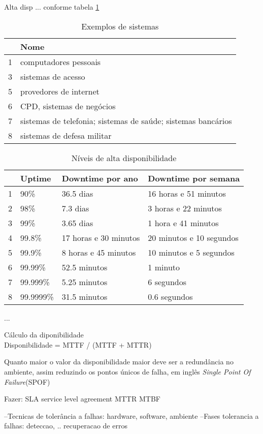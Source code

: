 Alta disp ... conforme tabela \ref{tab:dispexemplos}
\begin{table}
\caption {Exemplos de sistemas}
\label{tab:dispexemplos} 
\begin{center}
\begin{tabular}{|l|l|}\hline
  & Nome\\\hline
1 & computadores pessoais\\\hline
3 & sistemas de acesso\\\hline
5 & provedores de internet\\\hline
6 & CPD, sistemas de negócios\\\hline
7 & sistemas de telefonia; sistemas de saúde; sistemas bancários\\\hline
8 & sistemas de defesa militar\\\hline
\end{tabular}
\end{center}
\end{table}

\begin{table}
\caption {Níveis de alta disponibilidade}
\label{tab:dispniveis} 
\begin{center}
\begin{tabular}{|l|l|l|l|}\hline
  & Uptime & Downtime por ano & Downtime por semana\\\hline
1 & 90\% & 36.5 dias & 16 horas e 51 minutos\\\hline
2 & 98\% & 7.3 dias & 3 horas e 22 minutos\\\hline
3 & 99\% & 3.65 dias & 1 hora e 41 minutos\\\hline
4 & 99.8\% & 17 horas e 30 minutos & 20 minutos e 10 segundos\\\hline
5 & 99.9\% & 8 horas e 45 minutos & 10 minutos e 5 segundos\\\hline
6 & 99.99\% & 52.5 minutos & 1 minuto\\\hline
7 & 99.999\% & 5.25 minutos & 6 segundos\\\hline
8 & 99.9999\% & 31.5 minutos & 0.6 segundos\\\hline
\end{tabular}
\end{center}
\end{table}

...

Cálculo da diponibilidade\\
Disponibilidade = MTTF / (MTTF + MTTR)

Quanto maior o valor da disponibilidade maior deve ser a redundância no ambiente, assim reduzindo os pontos únicos de falha,
em inglês \textit{Single Point Of Failure}(SPOF)

Fazer: 
SLA service level agreement
MTTR
MTBF


--Tecnicas de tolerância a falhas: hardware, software, ambiente
--Fases tolerancia a falhas: deteccao, .. recuperacao de erros

